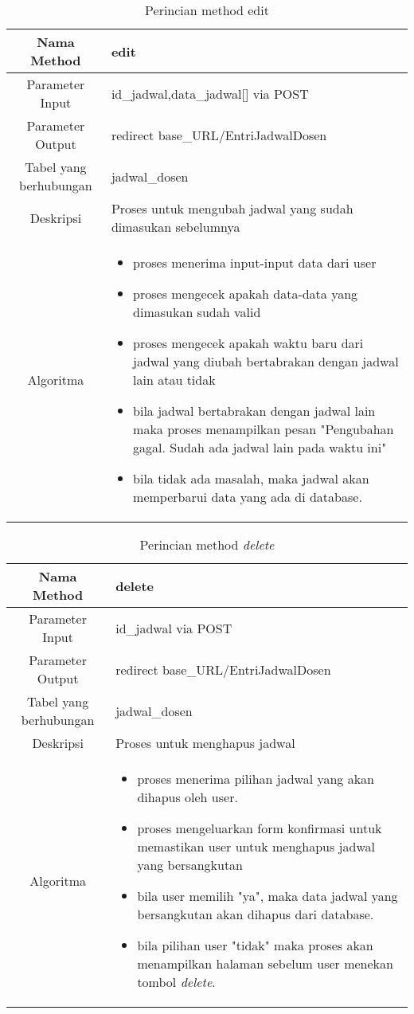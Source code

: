 \begin{center}
\begin{table}[H]
\begin{tabular}{|c|p{11cm}|}
\hline
Nama Method 	& 	edit 	\\
\hline
Parameter Input & id\_jadwal,data\_jadwal[] via POST \\
\hline
Parameter Output & redirect base\_URL/EntriJadwalDosen \\
\hline
Tabel yang berhubungan & jadwal\_dosen \\
\hline
Deskripsi	& Proses untuk mengubah jadwal yang sudah dimasukan sebelumnya \\
\hline
Algoritma	& \begin{itemize}
				\item proses menerima input-input data dari user
				\item proses mengecek apakah data-data yang dimasukan sudah valid
				\item proses mengecek apakah waktu baru dari jadwal yang diubah bertabrakan dengan jadwal lain atau tidak
				\item bila jadwal bertabrakan dengan jadwal lain maka proses menampilkan pesan "Pengubahan gagal. Sudah ada jadwal lain pada waktu ini"
				\item bila tidak ada masalah, maka jadwal akan memperbarui data yang ada di database.
				\end{itemize} \\
\hline
\end{tabular}
\caption{Perincian method edit}
\end{table}
\end{center}

\begin{center}
\begin{table}[H]
\begin{tabular}{|c|p{11cm}|}
\hline
Nama Method 	& 	delete 	\\
\hline
Parameter Input & id\_jadwal via POST \\
\hline
Parameter Output & redirect base\_URL/EntriJadwalDosen \\
\hline
Tabel yang berhubungan & jadwal\_dosen \\
\hline
Deskripsi	& Proses untuk menghapus jadwal \\
\hline
Algoritma	& \begin{itemize}
				\item proses menerima pilihan jadwal yang akan dihapus oleh user.
				\item proses mengeluarkan form konfirmasi untuk memastikan user untuk menghapus jadwal yang bersangkutan
				\item bila user memilih "ya", maka data jadwal yang bersangkutan akan dihapus dari database.
				\item bila pilihan user "tidak" maka proses akan menampilkan halaman sebelum user menekan tombol \textit{delete}.
				\end{itemize} \\
\hline
\end{tabular}
\caption{Perincian method \textit{delete}}
\end{table}
\end{center}


